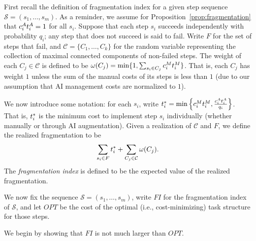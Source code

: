 First recall the definition of fragmentation index for a given step sequence $\mathcal{S} = (s_1, \dotsc, s_m)$.
As a reminder, we assume for Proposition~\ref{prop:fragmentation} that $c^{A}_{i}t^{A}_{i} = 1$ for all $s_i$.
Suppose that each step $s_i$ succeeds independently with probability $q_i$; any step that does not succeed is said to fail.
Write $F$ for the set of steps that fail, and $\mathcal{C} = \{C_1, \dotsc, C_k\}$ for the random variable representing the collection of maximal connected components of non-failed steps.
The weight of each $C_j \in \mathcal{C}$ is defined to be $\omega(C_j) = \min\{ 1, \sum_{s_i \in C_j} c^{M}_{i}t^{M}_{i} \}$.
That is, each $C_j$ has weight $1$ unless the sum of the manual costs of its steps is less than $1$ (due to our assumption that AI management costs are normalized to $1$).

We now introduce some notation: for each $s_i$, write $t^*_{i} = \min\left\{c^{M}_{i}t^{M}_{i}, \frac{c^{A}_{i}t^{A}_{i}}{q_i}\right\}$.
That is, $t^*_{i}$ is the minimum cost to implement step $s_i$ individually (whether manually or through AI augmentation).
Given a realization of $\mathcal{C}$ and $F$, we define the realized fragmentation to be
\[ \sum_{s_i \in F}t^*_{i} + \sum_{C_j \in \mathcal{C}} \omega(C_j).\]
The \emph{fragmentation index} is defined to be the expected value of the realized fragmentation.

We now fix the sequence $\mathcal{S} = (s_1, \dotsc, s_m)$, write $FI$ for the fragmentation index of $\mathcal{S}$, and let $OPT$ be the cost of the optimal (i.e., cost-minimizing) task structure for those steps.

We begin by showing that $FI$ is not much larger than $OPT$.

